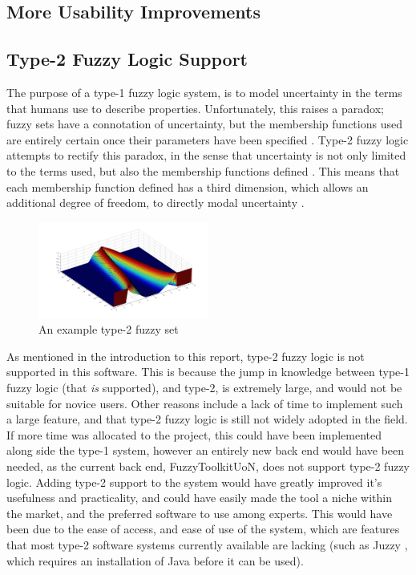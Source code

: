 \subsection{More Usability Improvements}

\subsection{Type-2 Fuzzy Logic Support}
\label{sec:type2}
The purpose of a type-1 fuzzy logic system, is to model uncertainty in the terms that humans use to describe properties. Unfortunately, this raises a paradox; fuzzy sets have a connotation of uncertainty, but the membership functions used are entirely certain once their parameters have been specified \cite{mendel2003type}. Type-2 fuzzy logic attempts to rectify this paradox, in the sense that uncertainty is not only limited to the terms used, but also the membership functions defined \cite{castillo2003type}. This means that each membership function defined has a third dimension, which allows an additional degree of freedom, to directly modal uncertainty \cite{mendel2002type}.

\begin{figure}[ht!]
	\begin{center}
		\includegraphics[width=0.5\textwidth]{images/type2set}
	\end{center}
	\vspace{-4mm}
	\caption{An example type-2 fuzzy set}
	\label{fig:fw-type2}
	\vspace{-1mm}
\end{figure}

As mentioned in the introduction to this report, type-2 fuzzy logic is not supported in this software. This is because the jump in knowledge between type-1 fuzzy logic (that \emph{is} supported), and type-2, is extremely large, and would not be suitable for novice users. Other reasons include a lack of time to implement such a large feature, and that type-2 fuzzy logic is still not widely adopted in the field. If more time was allocated to the project, this could have been implemented along side the type-1 system, however an entirely new back end would have been needed, as the current back end, FuzzyToolkitUoN, does not support type-2 fuzzy logic. Adding type-2 support to the system would have greatly improved it's usefulness and practicality, and could have easily made the tool a niche within the market, and the preferred software to use among experts. This would have been due to the ease of access, and ease of use of the system, which are  features that most type-2 software systems currently available are lacking (such as Juzzy \cite{wagner2013juzzy}, which requires an installation of Java before it can be used).

